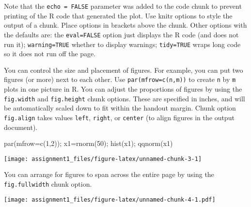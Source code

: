 \documentclass[
  11pt,
]{article}
\newenvironment{Shaded}{\begin{snugshade}}{\end{snugshade}}
\newcommand{\AttributeTok}[1]{\textcolor[rgb]{0.77,0.63,0.00}{#1}}
\newcommand{\DecValTok}[1]{\textcolor[rgb]{0.00,0.00,0.81}{#1}}
\newcommand{\FunctionTok}[1]{\textcolor[rgb]{0.00,0.00,0.00}{#1}}
\newcommand{\NormalTok}[1]{#1}
\newcommand{\OtherTok}[1]{\textcolor[rgb]{0.56,0.35,0.01}{#1}}
\newcommand{\SpecialCharTok}[1]{\textcolor[rgb]{0.00,0.00,0.00}{#1}}
\newcommand{\StringTok}[1]{\textcolor[rgb]{0.31,0.60,0.02}{#1}}
\begin{document}
Note that the \texttt{echo\ =\ FALSE} parameter was added to the code
chunk to prevent printing of the R code that generated the plot. Use
knitr options to style the output of a chunk. Place options in brackets
above the chunk. Other options with the defaults are: the
\texttt{eval=FALSE} option just displays the R code (and does not run
it); \texttt{warning=TRUE} whether to display warnings;
\texttt{tidy=TRUE} wraps long code so it does not run off the page.

You can control the size and placement of figures. For example, you can
put two figures (or more) next to each other. Use
\texttt{par(mfrow=c(n,m))} to create \texttt{n} by \texttt{m} plots in
one picture in R. You can adjust the proportions of figures by using the
\texttt{fig.width} and \texttt{fig.height} chunk options. These are
specified in inches, and will be automatically scaled down to fit within
the handout margin. Chunk option \texttt{fig.align} takes values
\texttt{left}, \texttt{right}, or \texttt{center} (to align figures in
the output document).

\begin{Shaded}
\begin{Highlighting}[]
\FunctionTok{par}\NormalTok{(}\AttributeTok{mfrow=}\FunctionTok{c}\NormalTok{(}\DecValTok{1}\NormalTok{,}\DecValTok{2}\NormalTok{)); x1}\OtherTok{=}\FunctionTok{rnorm}\NormalTok{(}\DecValTok{50}\NormalTok{); }\FunctionTok{hist}\NormalTok{(x1); }\FunctionTok{qqnorm}\NormalTok{(x1)}
\end{Highlighting}
\end{Shaded}

\begin{center}\texttt{[image: assignment1\_files/figure-latex/unnamed-chunk-3-1]} \end{center}

You can arrange for figures to span across the entire page by using the
\texttt{fig.fullwidth} chunk option.

\begin{Shaded}
\end{Shaded}

\texttt{[image: assignment1\_files/figure-latex/unnamed-chunk-4-1.pdf]}
\end{document}
